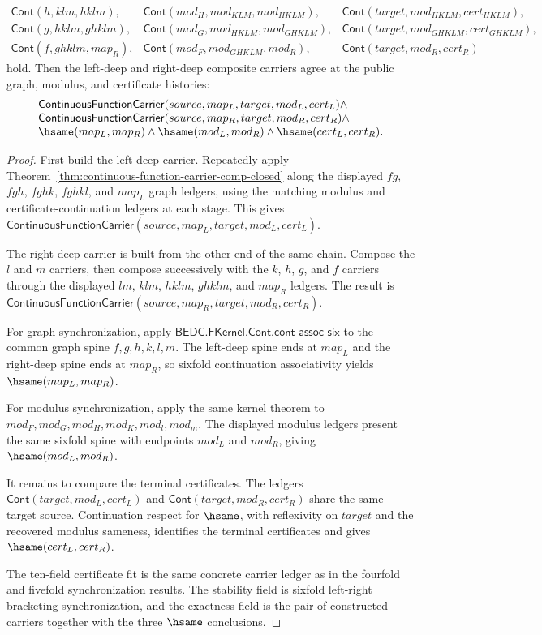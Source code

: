 \begin{theorem}
$$\begin{array}{lll}
\mathsf{Cont}(h,klm,hklm),&
\mathsf{Cont}(mod_H,mod_{KLM},mod_{HKLM}),&
\mathsf{Cont}(target,mod_{HKLM},cert_{HKLM}),\\
\mathsf{Cont}(g,hklm,ghklm),&
\mathsf{Cont}(mod_G,mod_{HKLM},mod_{GHKLM}),&
\mathsf{Cont}(target,mod_{GHKLM},cert_{GHKLM}),\\
\mathsf{Cont}(f,ghklm,map_R),&
\mathsf{Cont}(mod_F,mod_{GHKLM},mod_R),&
\mathsf{Cont}(target,mod_R,cert_R)
\end{array}
$$
hold. Then the left-deep and right-deep composite carriers agree at the
public graph, modulus, and certificate histories:
$$
\begin{array}{l}
\mathsf{ContinuousFunctionCarrier}(source,map_L,target,mod_L,cert_L)\land\\
\mathsf{ContinuousFunctionCarrier}(source,map_R,target,mod_R,cert_R)\land\\
\hsame(map_L,map_R)\land\hsame(mod_L,mod_R)\land\hsame(cert_L,cert_R).
\end{array}
$$
\end{theorem}
\begin{proof}
First build the left-deep carrier. Repeatedly apply
Theorem~\ref{thm:continuous-function-carrier-comp-closed} along the displayed
$fg$, $fgh$, $fghk$, $fghkl$, and $map_L$ graph ledgers, using the matching
modulus and certificate-continuation ledgers at each stage. This gives
$\mathsf{ContinuousFunctionCarrier}(source,map_L,target,mod_L,cert_L)$.

The right-deep carrier is built from the other end of the same chain. Compose
the $l$ and $m$ carriers, then compose successively with the $k$, $h$, $g$,
and $f$ carriers through the displayed $lm$, $klm$, $hklm$, $ghklm$, and
$map_R$ ledgers. The result is
$\mathsf{ContinuousFunctionCarrier}(source,map_R,target,mod_R,cert_R)$.

For graph synchronization, apply
$\mathsf{BEDC.FKernel.Cont.cont\_assoc\_six}$ to the common graph spine
$f,g,h,k,l,m$. The left-deep spine ends at $map_L$ and the right-deep spine
ends at $map_R$, so sixfold continuation associativity yields
$\hsame(map_L,map_R)$.

For modulus synchronization, apply the same kernel theorem to
$mod_F,mod_G,mod_H,mod_K,mod_l,mod_m$. The displayed modulus ledgers present
the same sixfold spine with endpoints $mod_L$ and $mod_R$, giving
$\hsame(mod_L,mod_R)$.

It remains to compare the terminal certificates. The ledgers
$\mathsf{Cont}(target,mod_L,cert_L)$ and
$\mathsf{Cont}(target,mod_R,cert_R)$ share the same target source.
Continuation respect for $\hsame$, with reflexivity on $target$ and the
recovered modulus sameness, identifies the terminal certificates and gives
$\hsame(cert_L,cert_R)$.

The ten-field certificate fit is the same concrete carrier ledger as in the
fourfold and fivefold synchronization results. The stability field is sixfold
left-right bracketing synchronization, and the exactness field is the pair of
constructed carriers together with the three $\hsame$ conclusions.
\end{proof}

